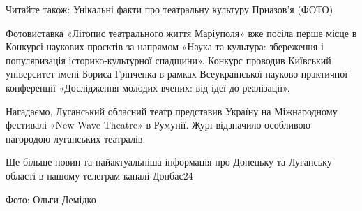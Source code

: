 Читайте також: Унікальні факти про театральну культуру Приазов'я (ФОТО)

Фотовиставка «Літопис театрального життя Маріуполя» вже посіла перше місце в Конкурсі наукових проєктів за напрямом «Наука та культура: збереження і популяризація історико-культурної спадщини». Конкурс проводив Київський університет імені Бориса Грінченка в рамках Всеукраїнської науково-практичної конференції «Дослідження молодих вчених: від ідеї до реалізації».

Нагадаємо, Луганський обласний театр представив Україну на Міжнародному фестивалі «New Wave Theatre» в Румунії. Журі відзначило особливою нагородою луганських театралів.

Ще більше новин та найактуальніша інформація про Донецьку та Луганську області в нашому телеграм-каналі Донбас24

Фото: Ольги Демідко
